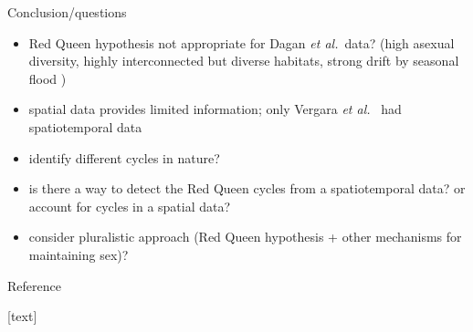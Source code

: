 \documentclass{beamer}
\newcommand{\etal}{\emph{et al.}}
\begin{document}
\begin{frame}{Conclusion/questions}
\begin{itemize}
    \item Red Queen hypothesis not appropriate for Dagan \etal\ data? (high asexual diversity, highly interconnected but diverse habitats, strong drift by seasonal flood \cite{ben2007temporal})
    \item spatial data provides limited information; only Vergara \etal\ \cite{vergara2014infection} had spatiotemporal data
    \item identify different cycles in nature?
    \item is there a way to detect the Red Queen cycles from a spatiotemporal data? or account for cycles in a spatial data?
    \item consider pluralistic approach (Red Queen hypothesis + other mechanisms for maintaining sex)?
\end{itemize}
\end{frame}

\begin{frame}{Reference}
\tiny{
[text]


}
\end{frame}
    
\end{document}

